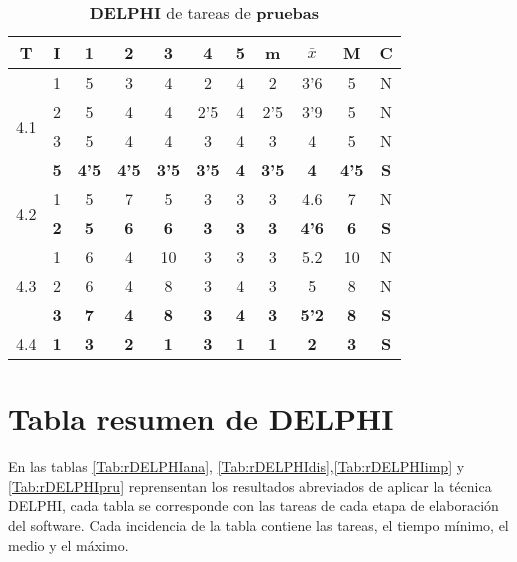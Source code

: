 \documentclass[11pt,a4paper,spanish,twoside]{report}
\begin{document}
\begin{table}[!h]
\centering
  \begin{tabular}{|c|c||c|c|c|c|c||c|c|c||c|}
    \hline
    \textbf{T} & \textbf{I} & \textbf{1} &
    \textbf{2} & \textbf{3} & \textbf{4} & \textbf{5} & \textbf{m}
    &\textbf{$\bar{x}$} &\textbf{M} & \textbf{C}\\    
    \hline \hline

    \multirow{4}{*}{4.1}
    & 1 & 5 & 3 & 4 & 2   & 4 & 2   & 3'6 & 5 & N \\
    & 2 & 5 & 4 & 4 & 2'5 & 4 & 2'5 & 3'9 & 5 & N \\
    & 3 & 5 & 4 & 4 & 3   & 4 & 3   & 4   & 5 & N \\
    & \textbf{5} & \textbf{4'5} & \textbf{4'5} & \textbf{3'5} & \textbf{3'5}
    & \textbf{4} & \textbf{3'5} & \textbf{4} & \textbf{4'5} & \textbf{S} \\
    \hline
    
    \multirow{2}{*}{4.2} & 1 & 5 & 7 & 5 & 3 & 3 & 3 & 4.6 & 7 & N \\
    & \textbf{2} & \textbf{5} & \textbf{6} & \textbf{6} & \textbf{3} &
    \textbf{3} & \textbf{3} & \textbf{4'6} & \textbf{6} & \textbf{S} \\
    \hline

    \multirow{3}{*}{4.3}
    & 1 & 6 & 4 & 10 & 3 & 3 & 3 & 5.2 & 10 & N \\
    & 2 & 6 & 4 & 8  & 3 & 4 & 3 & 5   & 8  & N \\
    & \textbf{3} & \textbf{7} & \textbf{4} & \textbf{8} & \textbf{3} &
    \textbf{4} & \textbf{3} & \textbf{5'2} & \textbf{8} & \textbf{S} \\
    \hline

    4.4 & \textbf{1} & \textbf{3} & \textbf{2} & \textbf{1} &
    \textbf{3} & \textbf{1} & \textbf{1} & \textbf{2} & \textbf{3} &
    \textbf{S} \\
    \hline
  \end{tabular}
  \caption{\textbf{DELPHI} de tareas de \textbf{pruebas}}
  \label{Tab:DELPHIpru}
\end{table} 

\section{Tabla resumen de DELPHI}
En las tablas \ref{Tab:rDELPHIana}, \ref{Tab:rDELPHIdis},\ref{Tab:rDELPHIimp} y
\ref{Tab:rDELPHIpru} reprensentan los resultados abreviados de aplicar la
técnica DELPHI, cada tabla se corresponde con las tareas de cada etapa de
elaboración del software. Cada incidencia de la tabla contiene las tareas, el
tiempo mínimo, el medio y el máximo.
\end{document}
